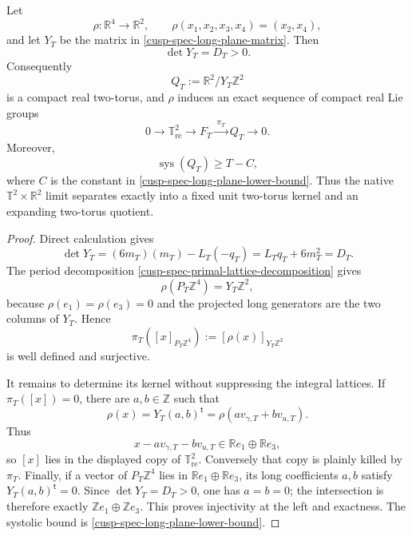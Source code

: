 \begin{proposition}
\label{cusp-spec-native-quotient}
Let
\begin{equation}
 \rho:\mathbb R^4\longrightarrow\mathbb R^2,
 \qquad
 \rho(x_1,x_2,x_3,x_4)=(x_2,x_4),
 \label{cusp-spec-native-projection}
\end{equation}
and let \(Y_T\) be the matrix in
\cref{cusp-spec-long-plane-matrix}.  Then
\begin{equation}
 \det Y_T=D_T>0.
 \label{cusp-spec-long-plane-determinant}
\end{equation}
Consequently
\begin{equation}
 Q_T:=\mathbb R^2/Y_T\mathbb Z^2
 \label{cusp-spec-expanding-quotient}
\end{equation}
is a compact real two-torus, and \(\rho\) induces an exact sequence of
compact real Lie groups
\begin{equation}
 0\longrightarrow\mathbb T^2_{\mathrm{re}}
 \longrightarrow F_T
 \xrightarrow{\ \pi_T\ }Q_T
 \longrightarrow0.
 \label{cusp-spec-native-exact-sequence}
\end{equation}
Moreover,
\begin{equation}
 \operatorname{sys}(Q_T)\ge T-C,
 \label{cusp-spec-expanding-quotient-systole}
\end{equation}
where \(C\) is the constant in
\cref{cusp-spec-long-plane-lower-bound}.  Thus the native
\(\mathbb T^2\times\mathbb R^2\) limit separates exactly into a fixed
unit two-torus kernel and an expanding two-torus quotient.
\end{proposition}

\begin{proof}
Direct calculation gives
\[
 \det Y_T=(6m_T)(m_T)-L_T(-q_T)
 =L_Tq_T+6m_T^2=D_T.
\]
The period decomposition
\cref{cusp-spec-primal-lattice-decomposition} gives
\[
 \rho(P_T\mathbb Z^4)=Y_T\mathbb Z^2,
\]
because \(\rho(e_1)=\rho(e_3)=0\) and the projected long generators
are the two columns of \(Y_T\).  Hence
\[
 \pi_T([x]_{P_T\mathbb Z^4})
 :=[\rho(x)]_{Y_T\mathbb Z^2}
\]
is well defined and surjective.

It remains to determine its kernel without suppressing the integral
lattices.  If \(\pi_T([x])=0\), there are \(a,b\in\mathbb Z\) such that
\[
 \rho(x)=Y_T(a,b)^{\mathsf t}
 =\rho(av_{\gamma,T}+bv_{u,T}).
\]
Thus
\[
 x-av_{\gamma,T}-bv_{u,T}
 \in\mathbb Re_1\oplus\mathbb Re_3,
\]
so \([x]\) lies in the displayed copy of
\(\mathbb T^2_{\mathrm{re}}\).  Conversely that copy is plainly killed by
\(\pi_T\).  Finally, if a vector of \(P_T\mathbb Z^4\) lies in
\(\mathbb Re_1\oplus\mathbb Re_3\), its long coefficients \(a,b\) satisfy
\(Y_T(a,b)^{\mathsf t}=0\).  Since \(\det Y_T=D_T>0\), one has
\(a=b=0\); the intersection is therefore exactly
\(\mathbb Ze_1\oplus\mathbb Ze_3\).  This proves injectivity at the left
and exactness.  The systolic bound is
\cref{cusp-spec-long-plane-lower-bound}.
\end{proof}

